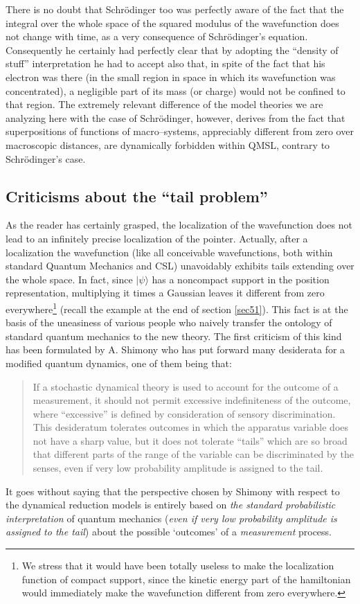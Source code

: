 \documentclass[12pt]{article}
\begin{document}
There is no doubt that Schr\"{o}dinger too was perfectly aware of
the fact that the integral over the whole space of the squared
modulus of the wavefunction does not change with time, as a very
consequence of Schr\"{o}dinger's equation. Consequently he
certainly had perfectly clear that by adopting the ``density of
stuff'' interpretation he had to accept also that, in spite of the
fact that his electron was there (in the small region in space in
which its wavefunction was concentrated), a negligible part of its
mass (or charge) would not be confined to that region. The
extremely relevant difference of the model theories we are
analyzing here with the case of Schr\"odinger, however, derives
from the fact that superpositions of functions of macro--systems,
appreciably different from zero over macroscopic distances, are
dynamically forbidden within QMSL, contrary to Schr\"odinger's
case.


\subsection{Criticisms about the ``tail problem''} \label{sec132}

As the reader has certainly grasped, the localization of the
wavefunction does not lead to an infinitely precise localization
of the pointer. Actually, after a localization the wavefunction
(like all conceivable wavefunctions, both within standard Quantum
Mechanics and CSL) unavoidably exhibits tails extending over the
whole space. In fact, since $|\psi\rangle$ has a noncompact
support in the position representation, multiplying it times a
Gaussian leaves it different from zero everywhere\footnote{We
stress that it would have been totally useless to make the
localization function of compact support, since the kinetic energy
part of the hamiltonian would immediately make the wavefunction
different from zero everywhere.} (recall the example at the end of
section \ref{sec51}). This fact is at the basis of the uneasiness
of various people who naively transfer the ontology of standard
quantum mechanics to the new theory. The first criticism of this
kind has been formulated by A. Shimony \cite{shi90} who has put
forward many desiderata for a modified quantum dynamics, one of
them being that:
\begin{quotation}
If a stochastic dynamical theory is used to account for the
outcome of a measurement, it should not permit excessive
indefiniteness of the outcome, where ``excessive'' is defined by
consideration of sensory discrimination. This desideratum
tolerates outcomes in which the apparatus variable does not have a
sharp value, but it does not tolerate ``tails'' which are so broad
that different parts of the range of the variable can be
discriminated by the senses, even if very low probability
amplitude is assigned to the tail.
\end{quotation}
It goes without saying that the perspective chosen by Shimony with
respect to the dynamical reduction models is entirely based on
{\it the standard probabilistic interpretation} of quantum
mechanics ({\it even if very low probability amplitude is assigned
to the tail}) about the possible `outcomes' of a {\it measurement}
process.
\end{document}
